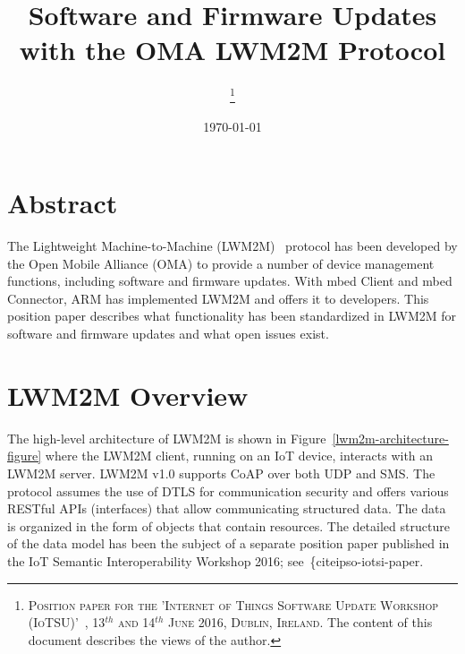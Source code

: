 \documentclass[peerreview, a4paper, 7pt]{IEEEtran}
\begin{document}
\title{Software and Firmware Updates with the OMA LWM2M Protocol}

\author{
\thanks{\textsc{Position paper for the 'Internet of Things Software Update Workshop (IoTSU)'~\cite{IOTSU}, 13$^{th}$ and 14$^{th}$ June 2016, Dublin, Ireland.} The content of this document describes the views of the author.}
}

\date{\today}

\maketitle


\section{Abstract}


The Lightweight Machine-to-Machine (LWM2M)~\cite{lwm2m} protocol has been developed by the Open Mobile Alliance (OMA) to provide a number of device management functions, including software and firmware updates. With mbed Client and mbed Connector, ARM has implemented LWM2M and offers it to developers. This position paper describes what functionality has been standardized in LWM2M for software and firmware updates and what open issues exist. 

\section{LWM2M Overview}
\label{lwm2m}

The high-level architecture of LWM2M is shown in Figure~\ref{lwm2m-architecture-figure} where the LWM2M client, running on an IoT device, interacts with an LWM2M server. LWM2M v1.0 supports  CoAP over both UDP and SMS. The protocol assumes the use of DTLS for communication security and offers various RESTful APIs (interfaces) that allow communicating structured data. The data is organized in the form of objects that contain resources. The detailed structure of the data model has been the subject of a separate position paper published in the IoT Semantic Interoperability Workshop 2016; see~\{cite{ipso-iotsi-paper}. 
\end{document}
